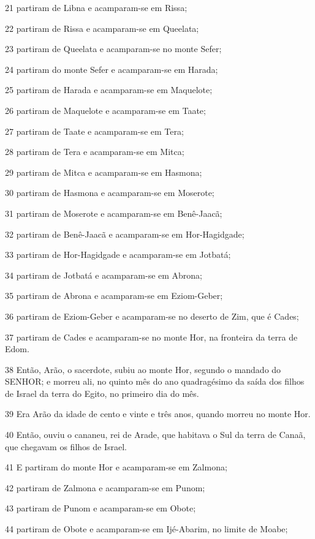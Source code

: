 \par 21 partiram de Libna e acamparam-se em Rissa;
\par 22 partiram de Rissa e acamparam-se em Queelata;
\par 23 partiram de Queelata e acamparam-se no monte Sefer;
\par 24 partiram do monte Sefer e acamparam-se em Harada;
\par 25 partiram de Harada e acamparam-se em Maquelote;
\par 26 partiram de Maquelote e acamparam-se em Taate;
\par 27 partiram de Taate e acamparam-se em Tera;
\par 28 partiram de Tera e acamparam-se em Mitca;
\par 29 partiram de Mitca e acamparam-se em Hasmona;
\par 30 partiram de Hasmona e acamparam-se em Moserote;
\par 31 partiram de Moserote e acamparam-se em Benê-Jaacã;
\par 32 partiram de Benê-Jaacã e acamparam-se em Hor-Hagidgade;
\par 33 partiram de Hor-Hagidgade e acamparam-se em Jotbatá;
\par 34 partiram de Jotbatá e acamparam-se em Abrona;
\par 35 partiram de Abrona e acamparam-se em Eziom-Geber;
\par 36 partiram de Eziom-Geber e acamparam-se no deserto de Zim, que é Cades;
\par 37 partiram de Cades e acamparam-se no monte Hor, na fronteira da terra de Edom.
\par 38 Então, Arão, o sacerdote, subiu ao monte Hor, segundo o mandado do SENHOR; e morreu ali, no quinto mês do ano quadragésimo da saída dos filhos de Israel da terra do Egito, no primeiro dia do mês.
\par 39 Era Arão da idade de cento e vinte e três anos, quando morreu no monte Hor.
\par 40 Então, ouviu o cananeu, rei de Arade, que habitava o Sul da terra de Canaã, que chegavam os filhos de Israel.
\par 41 E partiram do monte Hor e acamparam-se em Zalmona;
\par 42 partiram de Zalmona e acamparam-se em Punom;
\par 43 partiram de Punom e acamparam-se em Obote;
\par 44 partiram de Obote e acamparam-se em Ijé-Abarim, no limite de Moabe;
